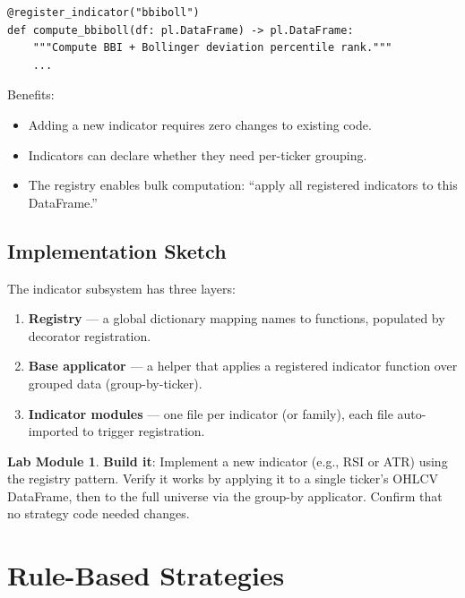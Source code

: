 \documentclass[a4paper, 11pt]{report}
\theoremstyle{definition}
\newtheorem{labmod}{Lab Module}[chapter]
\theoremstyle{remark}
\begin{document}
\begin{lstlisting}
@register_indicator("bbiboll")
def compute_bbiboll(df: pl.DataFrame) -> pl.DataFrame:
    """Compute BBI + Bollinger deviation percentile rank."""
    ...
\end{lstlisting}

Benefits:
\begin{itemize}
    \item Adding a new indicator requires zero changes to existing code.
    \item Indicators can declare whether they need per-ticker grouping.
    \item The registry enables bulk computation: ``apply all registered
          indicators to this DataFrame.''
\end{itemize}

\section{Implementation Sketch}

The indicator subsystem has three layers:

\begin{enumerate}
    \item \textbf{Registry} --- a global dictionary mapping names to
          functions, populated by decorator registration.
    \item \textbf{Base applicator} --- a helper that applies a registered
          indicator function over grouped data (group-by-ticker).
    \item \textbf{Indicator modules} --- one file per indicator (or family),
          each file auto-imported to trigger registration.
\end{enumerate}

\begin{labmod}
    \textbf{Build it}: Implement a new indicator (e.g., RSI or ATR) using the
    registry pattern.  Verify it works by applying it to a single ticker's OHLCV
    DataFrame, then to the full universe via the group-by applicator.  Confirm
    that no strategy code needed changes.
\end{labmod}


\chapter{Rule-Based Strategies}
\label{ch:rule-strategy}
\end{document}
